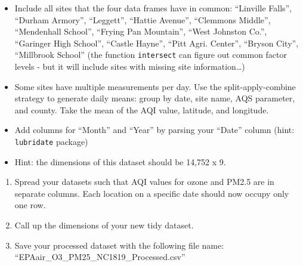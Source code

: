 \documentclass[
]{article}
\begin{document}
\begin{itemize}
\item
  Include all sites that the four data frames have in common: ``Linville
  Falls'', ``Durham Armory'', ``Leggett'', ``Hattie Avenue'', ``Clemmons
  Middle'', ``Mendenhall School'', ``Frying Pan Mountain'', ``West
  Johnston Co.'', ``Garinger High School'', ``Castle Hayne'', ``Pitt
  Agri. Center'', ``Bryson City'', ``Millbrook School'' (the function
  \texttt{intersect} can figure out common factor levels - but it will
  include sites with missing site information\ldots)
\item
  Some sites have multiple measurements per day. Use the
  split-apply-combine strategy to generate daily means: group by date,
  site name, AQS parameter, and county. Take the mean of the AQI value,
  latitude, and longitude.
\item
  Add columns for ``Month'' and ``Year'' by parsing your ``Date'' column
  (hint: \texttt{lubridate} package)
\item
  Hint: the dimensions of this dataset should be 14,752 x 9.
\end{itemize}

\begin{enumerate}
\def\labelenumi{\arabic{enumi}.}
\setcounter{enumi}{8}
\item
  Spread your datasets such that AQI values for ozone and PM2.5 are in
  separate columns. Each location on a specific date should now occupy
  only one row.
\item
  Call up the dimensions of your new tidy dataset.
\item
  Save your processed dataset with the following file name:
  ``EPAair\_O3\_PM25\_NC1819\_Processed.csv''
\end{enumerate}
\end{document}
